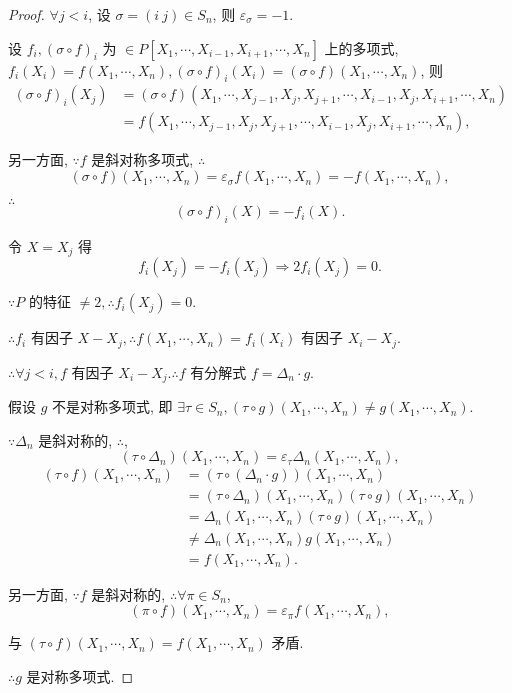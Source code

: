 \documentclass[UTF8]{ctexart}
\begin{document}
\begin{proof}
    $\forall j<i$, 设 $\sigma=(i\ j)\in S_n$, 则 $\varepsilon_\sigma=-1$.

    设 $f_i,(\sigma\circ f)_i$ 为 $\in P[X_1,\cdots,X_{i-1},X_{i+1},\cdots,X_n]$ 上的多项式, $f_i(X_i)=f(X_1,\cdots,X_n),(\sigma\circ f)_i(X_i)=(\sigma\circ f)(X_1,\cdots,X_n)$, 则
    \begin{align*}
        (\sigma\circ f)_i(X_j) & =(\sigma\circ f)(X_1,\cdots,X_{j-1},X_j,X_{j+1},\cdots,X_{i-1},X_j,X_{i+1},\cdots,X_n) \\
        & =f(X_1,\cdots,X_{j-1},X_j,X_{j+1},\cdots,X_{i-1},X_j,X_{i+1},\cdots,X_n),
    \end{align*}

    另一方面, $\because f$ 是斜对称多项式, $\therefore$
    \[(\sigma\circ f)(X_1,\cdots,X_n)=\varepsilon_\sigma f(X_1,\cdots,X_n)=-f(X_1,\cdots,X_n),\]

    $\therefore$
    \[(\sigma\circ f)_i(X)=-f_i(X).\]

    令 $X=X_j$ 得
    \[f_i(X_j)=-f_i(X_j)\Rightarrow2f_i(X_j)=0.\]

    $\because P$ 的特征 $\neq2,\therefore f_i(X_j)=0$.

    $\therefore f_i$ 有因子 $X-X_j,\therefore f(X_1,\cdots,X_n)=f_i(X_i)$ 有因子 $X_i-X_j$.

    $\therefore\forall j<i,f$ 有因子 $X_i-X_j.\therefore f$ 有分解式 $f=\Delta_n\cdot g$.

    假设 $g$ 不是对称多项式, 即 $\exists\tau\in S_n,(\tau\circ g)(X_1,\cdots,X_n)\neq g(X_1,\cdots,X_n)$.

    $\because\Delta_n$ 是斜对称的, $\therefore$,
    \[(\tau\circ\Delta_n)(X_1,\cdots,X_n)=\varepsilon_\tau\Delta_n(X_1,\cdots,X_n),\]
    \begin{align*}
        (\tau\circ f)(X_1,\cdots,X_n) & =(\tau\circ(\Delta_n\cdot g))(X_1,\cdots,X_n) \\
        & =(\tau\circ\Delta_n)(X_1,\cdots,X_n)(\tau\circ g)(X_1,\cdots,X_n) \\
        & =\Delta_n(X_1,\cdots,X_n)(\tau\circ g)(X_1,\cdots,X_n) \\
        & \neq\Delta_n(X_1,\cdots,X_n)g(X_1,\cdots,X_n) \\
        & =f(X_1,\cdots,X_n).
    \end{align*}
    
    另一方面, $\because f$ 是斜对称的, $\therefore\forall\pi\in S_n$,
    \[(\pi\circ f)(X_1,\cdots,X_n)=\varepsilon_\pi f(X_1,\cdots,X_n),\]

    与 $(\tau\circ f)(X_1,\cdots,X_n)=f(X_1,\cdots,X_n)$ 矛盾.

    $\therefore g$ 是对称多项式.
\end{proof}
\end{document}
